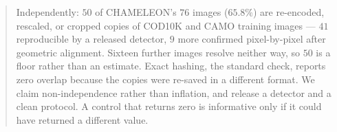 \documentclass{article} %
\begin{document}
\begin{abstract}
Independently: $50$ of CHAMELEON's $76$ images ($65.8\%$) are re-encoded, rescaled, or cropped copies of COD10K and CAMO training images --- $41$ reproducible by a released detector, $9$ more confirmed pixel-by-pixel after geometric alignment. Sixteen further images resolve neither way, so $50$ is a floor rather than an estimate. Exact hashing, the standard check, reports zero
overlap because the copies were re-saved in a different format. We claim non-independence rather than inflation, and release a detector and a clean protocol. A control that returns zero is informative only if it could have returned a different value.
%
%
%
\end{abstract}
\end{document}
